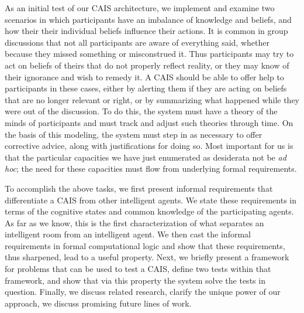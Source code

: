 As an initial test of our CAIS architecture, we implement and examine
two scenarios in which participants have an imbalance of knowledge and
beliefs, and how their their individual beliefs influence their actions.
It is common in group discussions that not all participants are aware
of everything said, whether because they missed something or
misconstrued it.  Thus participants may try to act on beliefs of
theirs that do not properly reflect reality, or they may know of their
ignorance and wish to remedy it.  A CAIS should be able to offer help
to participants in these cases, either by alerting them if they are
acting on beliefs that are no longer relevant or right, or by
summarizing what happened while they were out of the discussion.  To
do this, the system must have a theory of the minds
\cite{premack_does_1978,frith_theory_2005,arkoudas_propositional_2009} of participants
and must track and adjust such theories through time.  On the basis of
this modeling, the system must
step in as necessary to offer corrective advice, along with
justifications for doing so.  Most important for us is that the
particular capacities we have just enumerated as desiderata not be
\textit{ad hoc}; the need for these capacities must flow from
underlying formal requirements.

To accomplish the above tasks, we first present informal requirements
that differentiate a CAIS from other intelligent agents.  We state
these requirements in terms of the cognitive states and common
knowledge of the participating agents.  As far as we know, this is the
first characterization of what separates an intelligent room from an
intelligent agent.  We then cast the informal requirements in formal
computational logic and show that these requirements, thus sharpened,
lead to a useful property.  Next, we briefly present a framework for
problems that can be used to test a CAIS, define two tests within that
framework, and show that via this property the system solve the tests
in question.  Finally, we discuss related research, clarify the unique
power of our approach, we discuss promising future lines of work.
